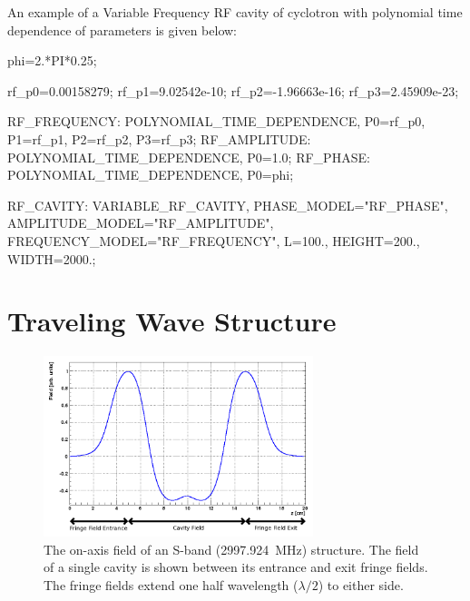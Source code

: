An example of a Variable Frequency RF cavity of cyclotron with polynomial
time dependence of parameters is given below:
\begin{example}
phi=2.*PI*0.25;

rf_p0=0.00158279;
rf_p1=9.02542e-10;
rf_p2=-1.96663e-16;
rf_p3=2.45909e-23;

RF_FREQUENCY: POLYNOMIAL_TIME_DEPENDENCE, P0=rf_p0, P1=rf_p1, P2=rf_p2, P3=rf_p3;
RF_AMPLITUDE: POLYNOMIAL_TIME_DEPENDENCE, P0=1.0;
RF_PHASE: POLYNOMIAL_TIME_DEPENDENCE, P0=phi;

RF_CAVITY: VARIABLE_RF_CAVITY, PHASE_MODEL="RF_PHASE", AMPLITUDE_MODEL="RF_AMPLITUDE",
           FREQUENCY_MODEL="RF_FREQUENCY", L=100., HEIGHT=200., WIDTH=2000.;
\end{example}

\clearpage
\section{Traveling Wave Structure}
\label{sec:travelingwave}

\begin{figure}[tb]
\centering
\includegraphics[width=0.7\textwidth]{./figures/traveling-wave-structure/FINSB-RAC-field.png}
\caption[The on-axis field of an S-band  structure]{The on-axis field of an S-band (2997.924~MHz)  structure.
    The field of a single cavity is shown between its entrance and exit fringe fields.
    The fringe fields extend one half wavelength ($\lambda/2$) to either side.}
\label{fig:FINSB-RAC-field}
\end{figure}

\begin{figure}[hbt]
  \centering
\end{figure}

